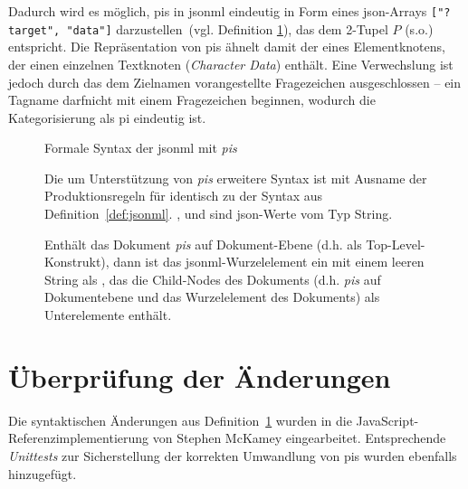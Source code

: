Dadurch wird es möglich, \glspl{pi} in \acrshort{jsonml} eindeutig in Form eines \acrshort{json}-Arrays \texttt{["?target", "data"]} darzustellen~(vgl. Definition \ref{def:jsonmlpi}), das dem 2-Tupel $P$ (s.o.) entspricht. Die Repräsentation von \glspl{pi} ähnelt damit der eines Elementknotens, der einen einzelnen Textknoten (\emph{Character Data}) enthält. Eine Verwechslung ist jedoch durch das dem Zielnamen vorangestellte Fragezeichen ausgeschlossen -- ein Tagname darfnicht mit einem Fragezeichen beginnen, wodurch die Kategorisierung als \gls{pi} eindeutig ist.

\begin{figure}[h]
    \begin{definition} Formale Syntax der \acrfull{jsonml} mit \emph{\glspl{pi}}
        \label{def:jsonmlpi}

        Die um Unterstützung von \emph{\glspl{pi}} erweitere Syntax ist mit Ausname der Produktionsregeln für  identisch zu der Syntax aus Definition~\ref{def:jsonml}.
        ,  und  sind \acrshort{json}-Werte vom Typ String.

        \begin{grammar}
            
        \end{grammar}

        Enthält das Dokument \emph{\glspl{pi}} auf Dokument-Ebene (d.h. als Top-Level-Konstrukt), dann ist das \acrshort{jsonml}-Wurzelelement ein  mit einem leeren String als , das die Child-Nodes des Dokuments (d.h. \emph{\glspl{pi}} auf Dokumentebene und das Wurzelelement des Dokuments) als Unterelemente enthält.
    \end{definition}
\end{figure}

\section{Überprüfung der Änderungen}

Die syntaktischen Änderungen aus Definition~\ref{def:jsonmlpi} wurden in die JavaScript-Referenz\-implementierung von Stephen McKamey eingearbeitet. Entsprechende \emph{Unittests} zur Sicherstellung der korrekten Umwandlung von \glspl{pi} wurden ebenfalls hinzugefügt.

